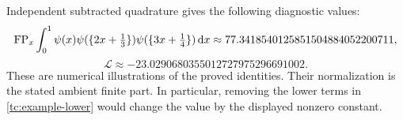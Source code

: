 Independent subtracted quadrature gives the following diagnostic values:
\[
 \operatorname{FP}_x\int_0^1\psi(x)\psi(\{2x+\tfrac13\})
                \psi(\{3x+\tfrac14\})\,\mathrm d x
       \approx77.3418540125851504884052200711,
\]
\[
 \mathcal L\approx-23.0290680355012727975296691002.
\]
These are numerical illustrations of the proved identities. Their
normalization is the stated ambient finite part. In particular, removing
the lower terms in \eqref{tc:example-lower} would change the value by
the displayed nonzero constant.
